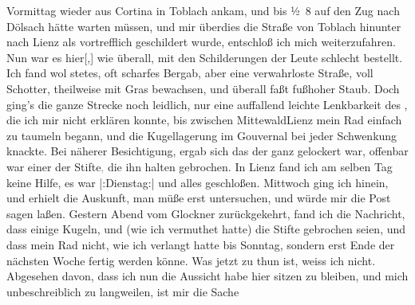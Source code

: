 \begin{ledgroupsized}[t]{13cm}
                  Vormittag wieder aus Cortina in
                  Toblach ankam, und bis ½ 8 auf
               den Zug nach Dölsach hätte warten müssen, und mir
               überdies die Straße von Toblach hinunter nach Lienz als vortrefflich geschildert wurde,
               entschloß ich mich weiterzufahren. Nun war es hier{[},{]}{ }{\pb}wie überall, mit den
               Schilderungen der Leute schlecht bestellt. Ich fand wol stetes, oft scharfes Bergab,
               aber eine verwahrloste Straße, voll Schotter, theilweise mit Gras bewachsen, und
               überall faßt fußhoher Staub. Doch ging’s die ganze Strecke noch leidlich, nur eine
               auffallend leichte Lenkbarkeit des \label{K_L03128-2v}\label{K_L03128-2h}, die
               ich mir nicht erklären konnte, bis zwischen MittewaldLienz mein Rad einfach zu taumeln begann, und die
               Kugellagerung im Gouvernal bei jeder Schwenkung knackte. Bei näherer Besichtigung,
               ergab sich das der \label{K_L03128-3v}\label{K_L03128-3h} ganz gelockert
               war, offenbar war einer der Stifte\textcolor{gray}{,} die ihn halten gebrochen. In Lienz fand ich am selben Tag
               keine Hilfe, es war |:Dienstag:| \label{K_L03128-4v}\label{K_L03128-4h} und alles geschloßen. Mittwoch ging ich hinein, und erhielt die Auskunft, man
               müße erst untersuchen, und würde mir die Post sagen laßen. Gestern{ }Abend vom Glockner zurückgekehrt,
               fand ich die Nachricht, dass einige Kugeln, und (wie ich vermuthet hatte) die Stifte
               gebrochen seien, und dass mein Rad nicht, wie ich {\pb}verlangt hatte bis Sonntag, sondern erst Ende der nächsten Woche fertig
               werden könne. Was jetzt zu thun ist, weiss ich nicht. Abgesehen davon, dass ich nun
               die Aussicht habe hier sitzen zu bleiben, und mich unbeschreiblich zu langweilen, ist
               mir die Sache \label{K_L03128-5v}
\end{ledgroupsized}

